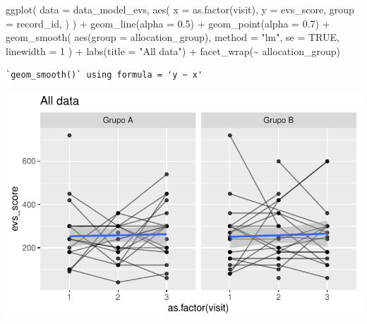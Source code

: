 \documentclass[
  letterpaper,
  DIV=11,
  numbers=noendperiod]{scrartcl}
\newenvironment{Shaded}{\begin{snugshade}}{\end{snugshade}}
\newcommand{\AttributeTok}[1]{\textcolor[rgb]{0.40,0.45,0.13}{#1}}
\newcommand{\ConstantTok}[1]{\textcolor[rgb]{0.56,0.35,0.01}{#1}}
\newcommand{\DecValTok}[1]{\textcolor[rgb]{0.68,0.00,0.00}{#1}}
\newcommand{\FloatTok}[1]{\textcolor[rgb]{0.68,0.00,0.00}{#1}}
\newcommand{\FunctionTok}[1]{\textcolor[rgb]{0.28,0.35,0.67}{#1}}
\newcommand{\NormalTok}[1]{\textcolor[rgb]{0.00,0.23,0.31}{#1}}
\newcommand{\SpecialCharTok}[1]{\textcolor[rgb]{0.37,0.37,0.37}{#1}}
\newcommand{\StringTok}[1]{\textcolor[rgb]{0.13,0.47,0.30}{#1}}
\begin{document}
\begin{Shaded}
\begin{Highlighting}[]
\FunctionTok{ggplot}\NormalTok{(}
    \AttributeTok{data =}\NormalTok{ data\_model\_evs, }
    \FunctionTok{aes}\NormalTok{(}
        \AttributeTok{x =} \FunctionTok{as.factor}\NormalTok{(visit),}
        \AttributeTok{y =}\NormalTok{ evs\_score,}
        \AttributeTok{group =}\NormalTok{ record\_id,}
\NormalTok{    )}
\NormalTok{) }\SpecialCharTok{+}
    \FunctionTok{geom\_line}\NormalTok{(}\AttributeTok{alpha =} \FloatTok{0.5}\NormalTok{) }\SpecialCharTok{+}
    \FunctionTok{geom\_point}\NormalTok{(}\AttributeTok{alpha =} \FloatTok{0.7}\NormalTok{) }\SpecialCharTok{+}
    \FunctionTok{geom\_smooth}\NormalTok{(}
        \FunctionTok{aes}\NormalTok{(}\AttributeTok{group =}\NormalTok{ allocation\_group),}
        \AttributeTok{method =} \StringTok{"lm"}\NormalTok{,}
        \AttributeTok{se =} \ConstantTok{TRUE}\NormalTok{,}
        \AttributeTok{linewidth =} \DecValTok{1}
\NormalTok{    ) }\SpecialCharTok{+}
    \FunctionTok{labs}\NormalTok{(}\AttributeTok{title =} \StringTok{"All data"}\NormalTok{) }\SpecialCharTok{+}
    \FunctionTok{facet\_wrap}\NormalTok{(}\SpecialCharTok{\textasciitilde{}}\NormalTok{ allocation\_group) }
\end{Highlighting}
\end{Shaded}

\begin{verbatim}
`geom_smooth()` using formula = 'y ~ x'
\end{verbatim}

\includegraphics{Outcomes_V1V2V3_files/figure-pdf/evs_score_6-1.pdf}
\end{document}
